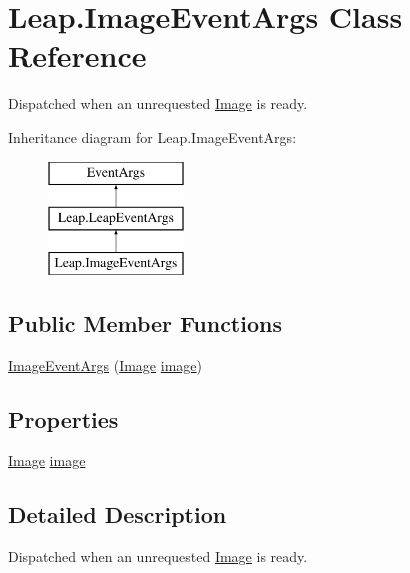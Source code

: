 \hypertarget{class_leap_1_1_image_event_args}{}\section{Leap.\+Image\+Event\+Args Class Reference}
\label{class_leap_1_1_image_event_args}


Dispatched when an unrequested \mbox{\hyperlink{class_leap_1_1_image}{Image}} is ready.  


Inheritance diagram for Leap.\+Image\+Event\+Args\+:\begin{figure}[H]
\begin{center}
\leavevmode
\includegraphics[height=3.000000cm]{class_leap_1_1_image_event_args}
\end{center}
\end{figure}
\subsection*{Public Member Functions}
\begin{DoxyCompactItemize}
\item 
\mbox{\hyperlink{class_leap_1_1_image_event_args_ad95b821e3de6b9b173b8e1f16521109b}{Image\+Event\+Args}} (\mbox{\hyperlink{class_leap_1_1_image}{Image}} \mbox{\hyperlink{class_leap_1_1_image_event_args_af6b4bda166dccb8868956722e975ae2f}{image}})
\end{DoxyCompactItemize}
\subsection*{Properties}
\begin{DoxyCompactItemize}
\item 
\mbox{\hyperlink{class_leap_1_1_image}{Image}} \mbox{\hyperlink{class_leap_1_1_image_event_args_af6b4bda166dccb8868956722e975ae2f}{image}}
\end{DoxyCompactItemize}


\subsection{Detailed Description}
Dispatched when an unrequested \mbox{\hyperlink{class_leap_1_1_image}{Image}} is ready. 

